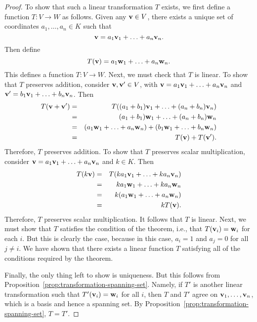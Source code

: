 \begin{proof}
  To show that such a linear transformation $T$ exists, we first
  define a function $T:V\to W$ as follows. Given any $\vect{v}\in V$,
  there exists a unique set of coordinates $a_1,\ldots,a_n\in K$ such
  that
  \begin{equation*}
    \vect{v} = a_1\vect{v}_1 + \ldots + a_n\vect{v}_n.
  \end{equation*}
  Then define
  \begin{equation*}
    T(\vect{v}) = a_1\vect{w}_1 + \ldots + a_n\vect{w}_n.
  \end{equation*}
  This defines a function $T:V\to W$.  Next, we must check that $T$ is
  linear. To show that $T$ preserves addition, consider
  $\vect{v},\vect{v}'\in V$, with
  $\vect{v} = a_1\vect{v}_1 + \ldots + a_n\vect{v}_n$ and
  $\vect{v}' = b_1\vect{v}_1 + \ldots + b_n\vect{v}_n$.  Then
  \begin{eqnarray*}
    T(\vect{v}+\vect{v}')
    &=& T((a_1+b_1)\vect{v}_1 + \ldots + (a_n+b_n)\vect{v}_n) \\
    &=& (a_1+b_1)\vect{w}_1 + \ldots + (a_n+b_n)\vect{w}_n \\
    &=& (a_1\vect{w}_1 + \ldots + a_n\vect{w}_n)
        + (b_1\vect{w}_1 + \ldots + b_n\vect{w}_n) \\
    &=& T(\vect{v}) + T(\vect{v}').
  \end{eqnarray*}
  Therefore, $T$ preserves addition. To show that $T$ preserves scalar
  multiplication, consider $\vect{v} = a_1\vect{v}_1 + \ldots +
  a_n\vect{v}_n$ and $k\in K$. Then
  \begin{eqnarray*}
    T(k\vect{v})
    &=& T(ka_1\vect{v}_1 + \ldots + ka_n\vect{v}_n) \\
    &=& ka_1\vect{w}_1 + \ldots + ka_n\vect{w}_n \\
    &=& k(a_1\vect{w}_1 + \ldots + a_n\vect{w}_n) \\
    &=& kT(\vect{v}).
  \end{eqnarray*}
  Therefore, $T$ preserves scalar multiplication. It follows that $T$
  is linear. Next, we must show that $T$ satisfies the condition of
  the theorem, i.e., that $T(\vect{v}_i) = \vect{w}_i$ for each $i$.
  But this is clearly the case, because in this case, $a_i=1$ and
  $a_j=0$ for all $j\neq i$. We have shown that there exists a linear
  function $T$ satisfying all of the conditions required by the
  theorem.

  Finally, the only thing left to show is uniqueness. But this follows
  from Proposition~\ref{prop:transformation-spanning-set}. Namely, if
  $T'$ is another linear transformation such that
  $T'(\vect{v}_i) = \vect{w}_i$ for all $i$, then $T$ and $T'$ agree
  on $\vect{v}_1,\ldots,\vect{v}_n$, which is a basis and hence a
  spanning set. By Proposition~\ref{prop:transformation-spanning-set},
  $T=T'$.
\end{proof}


